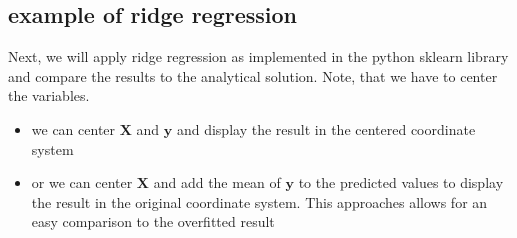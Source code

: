 \documentclass[letterpaper,10pt,english]{jupyterBook}
\begin{document}
\subsection{example of ridge regression}
\label{\detokenize{Regression_Techniques:example-of-ridge-regression}}
\sphinxAtStartPar
Next, we will apply ridge regression as implemented in the python sklearn library and compare the results to the analytical solution. Note, that we have to center the variables.
\begin{itemize}
\item {} 
\sphinxAtStartPar
we can center \(\mathbf{X}\) and \(\mathbf{y}\) and display the result in the centered coordinate system

\item {} 
\sphinxAtStartPar
or we can center \(\mathbf{X}\) and add the mean of \(\mathbf{y}\) to the predicted values to display the result in the original coordinate system. This approaches allows for an easy comparison to the overfitted result

\end{itemize}
\end{document}
